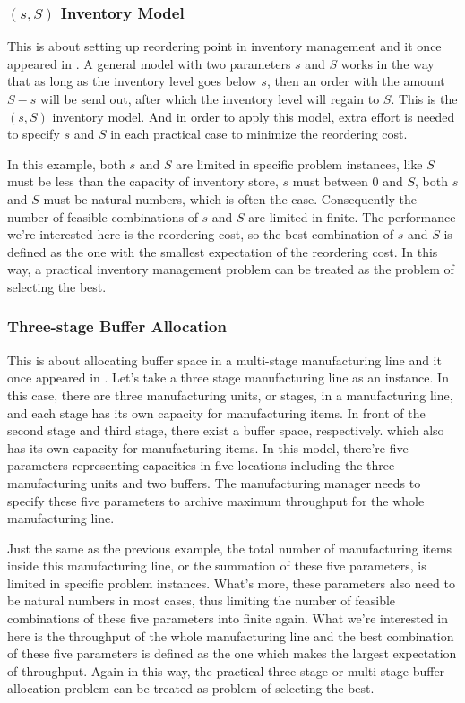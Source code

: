\documentclass[12pt,a4paper]{report}
\begin{document}
\subsubsection{$(s, S)$ Inventory Model}

This is about setting up reordering point in inventory management and it once appeared in \cite{cissac1985ss}. A general model with two parameters $s$ and $S$ works in the way that as long as the inventory level goes below $s$, then an order with the amount $S - s$ will be send out, after which the inventory level will regain to $S$. This is the $(s, S)$ inventory model. And in order to apply this model, extra effort is needed to specify $s$ and $S$ in each practical case to minimize the reordering cost.

In this example, both $s$ and $S$ are limited in specific problem instances, like $S$ must be less than the capacity of inventory store, $s$ must between $0$ and $S$, both $s$ and $S$ must be natural numbers, which is often the case. Consequently the number of feasible combinations of $s$ and $S$ are limited in finite. The performance we're interested here is the reordering cost, so the best combination of $s$ and $S$ is defined as the one with the smallest expectation of the reordering cost. In this way, a practical inventory management problem can be treated as the problem of selecting the best.

\subsubsection{Three-stage Buffer Allocation}

This is about allocating buffer space in a multi-stage manufacturing line and it once appeared in \cite{smoms93threestage}. Let's take a three stage manufacturing line as an instance. In this case, there are three manufacturing units, or stages, in a manufacturing line, and each stage has its own capacity for manufacturing items. In front of the second stage and third stage, there exist a buffer space, respectively. which also has its own capacity for manufacturing items. In this model, there're five parameters representing capacities in five locations including the three manufacturing units and two buffers. The manufacturing manager needs to specify these five parameters to archive maximum throughput for the whole manufacturing line.

Just the same as the previous example, the total number of manufacturing items inside this manufacturing line, or the summation of these five parameters, is limited in specific problem instances. What's more, these parameters also need to be natural numbers in most cases, thus limiting the number of feasible combinations of these five parameters into finite again. What we're interested in here is the throughput of the whole manufacturing line and the best combination of these five parameters is defined as the one which makes the largest expectation of throughput. Again in this way, the practical three-stage or multi-stage buffer allocation problem can be treated as problem of selecting the best.
\end{document}
